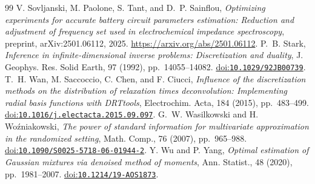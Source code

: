 \documentclass[10pt]{amsart}
\theoremstyle{definition}
\theoremstyle{remark}
\theoremstyle{plain}
\newcommand{\doi}[1]{\href{https://doi.org/#1}{doi:\nolinkurl{#1}}}
\begin{document}
\begin{thebibliography}{99}
 V. Sovljanski, M. Paolone, S. Tant, and D.~P. Sainflou, \emph{Optimizing experiments for accurate battery circuit parameters estimation: Reduction and adjustment of frequency set used in electrochemical impedance spectroscopy}, preprint, arXiv:2501.06112, 2025. \url{https://arxiv.org/abs/2501.06112}.
 P.~B. Stark, \emph{Inference in infinite-dimensional inverse problems: Discretization and duality}, J. Geophys. Res. Solid Earth, 97 (1992), pp.~14055--14082. \doi{10.1029/92JB00739}.
 T.~H. Wan, M. Saccoccio, C. Chen, and F. Ciucci, \emph{Influence of the discretization methods on the distribution of relaxation times deconvolution: Implementing radial basis functions with DRTtools}, Electrochim. Acta, 184 (2015), pp.~483--499. \doi{10.1016/j.electacta.2015.09.097}.
 G.~W. Wasilkowski and H. Wo\'zniakowski, \emph{The power of standard information for multivariate approximation in the randomized setting}, Math. Comp., 76 (2007), pp.~965--988. \doi{10.1090/S0025-5718-06-01944-2}.
 Y. Wu and P. Yang, \emph{Optimal estimation of Gaussian mixtures via denoised method of moments}, Ann. Statist., 48 (2020), pp.~1981--2007. \doi{10.1214/19-AOS1873}.
\end{thebibliography}
\end{document}
